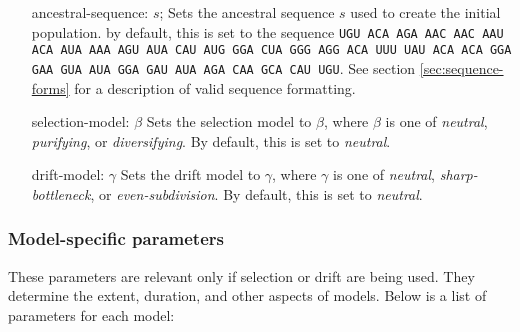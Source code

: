 \documentclass{article}
\begin{document}
\begin{enumerate}
          \item[ancestral-sequence: $s$;]
          Sets the ancestral sequence $s$ used to create the initial population.
          by default, this is set to the sequence {\tt UGU ACA AGA AAC AAC AAU
          ACA AUA AAA AGU AUA CAU AUG GGA CUA GGG AGG ACA UUU UAU ACA ACA GGA
          GAA GUA AUA GGA GAU AUA AGA CAA GCA CAU UGU}. See section
	  \ref{sec:sequence-forms} for a description of valid sequence
	  formatting.

          \item[selection-model: $\beta$]
          Sets the selection model to $\beta$, where $\beta$ is one of {\em
          neutral}, {\em purifying}, or {\em diversifying}. By default, this is
          set to {\em neutral}.

          \item[drift-model: $\gamma$]
          Sets the drift model to $\gamma$, where $\gamma$ is one of {\em
          neutral}, {\em sharp-bottleneck}, or {\em even-subdivision}. By
          default, this is set to {\em neutral}.
        \end{enumerate}

      \subsubsection{Model-specific parameters}
        \label{sec:model-directives}

        These parameters are relevant only if selection or drift are being used.
        They determine the extent, duration, and other aspects of models. Below
        is a list of parameters for each model:
\end{document}
